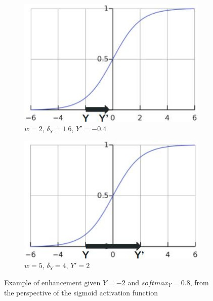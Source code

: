 \begin{figure}[h]
     \centering
     \begin{subfigure}{0.47\textwidth}
         \centering
         \includegraphics[width=\textwidth]{figures/ex_enhancement_w2.JPG}
          \caption{$w=2$,  $\delta_{Y} = 1.6$,  $Y'=-0.4$}
         \label{fig:sigmoid_example_w2}
     \end{subfigure}
     \hfill
     \begin{subfigure}{0.47\textwidth}
         \centering
         \includegraphics[width=\textwidth]{figures/ex_enhancement_w5.JPG}
         \caption{$w=5$,  $\delta_{Y} = 4$,  $Y'=2$}
         \label{fig:sigmoid_example_w1}
     \end{subfigure}
        \caption{Example of enhancement given $Y = -2$ and $softmax_{Y} = 0.8$, from the perspective of the sigmoid activation function}
        \label{fig:sigmoid_example}
\end{figure}

